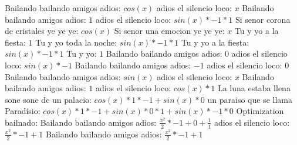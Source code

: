 \documentclass{article}
\begin{document}
Bailando bailando amigos adios: $cos(x)$  \newline adios el silencio loco: $x$ Bailando bailando amigos adios: $1$  \newline adios el silencio loco: $sin(x)*-1*1$ Si senor corona de cristales ye ye ye: $cos(x)$  \newline Si senor una emocion ye ye ye: $x$ Tu y yo a la fiesta: $1$  \newline Tu y yo toda la noche: $sin(x)*-1*1$ Tu y yo a la fiesta: $sin(x)*-1*1$ Tu y yo: $1$ Bailando bailando amigos adios: $0$  \newline adios el silencio loco: $sin(x)*-1$ Bailando bailando amigos adios: $-1$ adios el silencio loco: $0$  \newline Bailando bailando amigos adios: $sin(x)$  \newline adios el silencio loco: $x$ Bailando bailando amigos adios: $1$  \newline adios el silencio loco: $cos(x)*1$ La luna estaba llena sone sone de un palacio: $cos(x)*1*-1+sin(x)*0$ un paraiso que se llama Paradisio: ${cos(x)*1*-1+sin(x)*0}*1+sin(x)*-1*0$  \newline \newline Optimization bailnado: \newline Bailando bailando amigos adios: $\frac{x^2}{2}*-1+0+\frac{1}{1}$  \newline adios el silencio loco: $\frac{x^2}{2}*-1+1$  \newline Bailando bailando amigos adios: $\frac{x^2}{2}*-1+1$  \newline 
\end{document}
